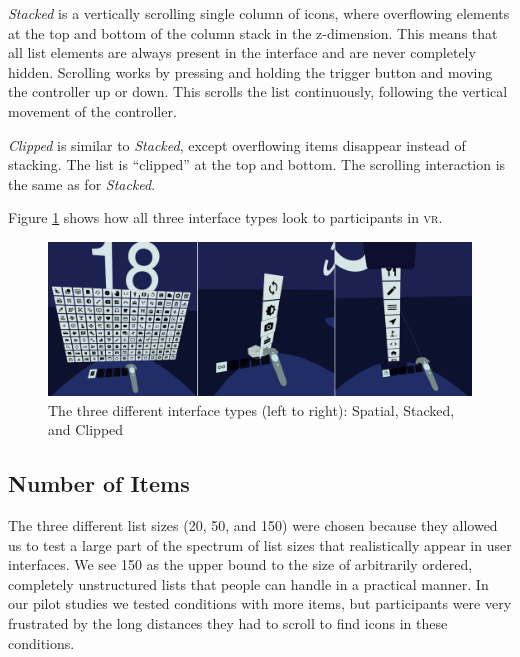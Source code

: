 \documentclass[nobib]{tufte-book} %
\begin{document}
\emph{Stacked} is a vertically scrolling single column of icons, where overflowing elements at the top and bottom of the column stack in the z-dimension. This means that all list elements are always present in the interface and are never completely hidden. Scrolling works by pressing and holding the trigger button and moving the controller up or down. This scrolls the list continuously, following the vertical movement of the controller.

\emph{Clipped} is similar to \emph{Stacked}, except overflowing items disappear instead of stacking. The list is ``clipped'' at the top and bottom. The scrolling interaction is the same as for \emph{Stacked}.

Figure \ref{fig:interface-types} shows how all three interface types look to participants in \textsc{vr}.

\begin{figure}[h]
\includegraphics[width=\linewidth]{interface-types.png}
\caption{The three different interface types (left to right): Spatial, Stacked, and Clipped}
\label{fig:interface-types}
\end{figure}

\subsection{Number of Items}
The three different list sizes (20, 50, and 150) were chosen because they allowed us to test a large part of the spectrum of list sizes that realistically appear in user interfaces. We see 150 as the upper bound to the size of arbitrarily ordered, completely unstructured lists that people can handle in a practical manner. In our pilot studies we tested conditions with more items, but participants were very frustrated by the long distances they had to scroll to find icons in these conditions.
\end{document}
